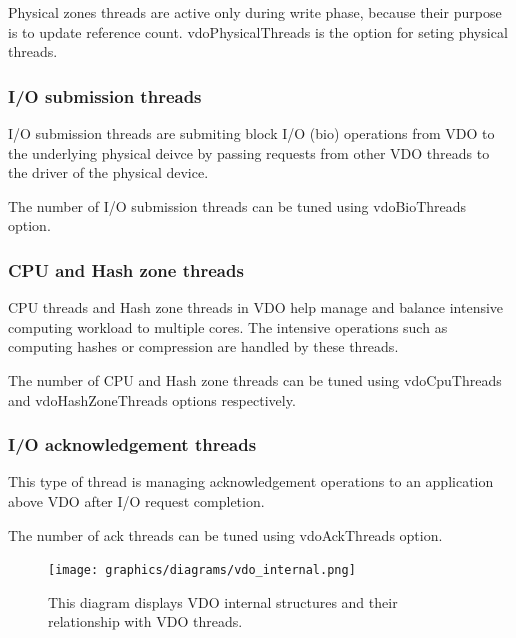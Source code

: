 \documentclass[
  color, %
  table, %
  lof,   %
  lot,   %
]{fithesis3}
\begin{document}
Physical zones threads are active only during write phase, because their purpose is to update reference count. vdoPhysicalThreads is the option for seting physical threads.


\subsubsection{I/O submission threads}
I/O submission threads are submiting block I/O (bio) operations from VDO to the underlying physical deivce by passing requests from other VDO threads to the driver of the physical device. 

The number of I/O submission threads can be tuned using vdoBioThreads option.

\subsubsection{CPU and Hash zone threads}
CPU threads and Hash zone threads in VDO help manage and balance intensive computing workload to multiple cores. The intensive operations such as computing hashes or compression are handled by these threads.

The number of CPU and Hash zone threads can be tuned using vdoCpuThreads and vdoHashZoneThreads options respectively.

\subsubsection{I/O acknowledgement threads}
This type of thread is managing acknowledgement operations to an application above VDO after I/O request completion.

The number of ack threads can be tuned using vdoAckThreads option.




\addtolength{\textheight}{1.75in}
\begin{landscape}
\begin{figure}[!hb]
        \centering
        \texttt{[image: graphics/diagrams/vdo\_internal.png]}
\caption[VDO threads and internal structures]{This diagram displays VDO internal structures and their relationship with VDO threads.}
\label{fig:VDO-internals}
\end{figure}
\end{landscape}
\addtolength{\textheight}{-1.75in}
\end{document}
